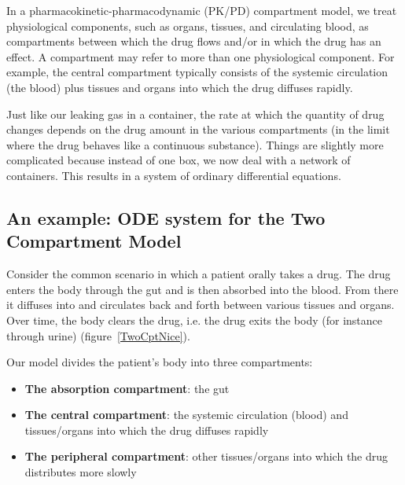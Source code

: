 \documentclass[11pt]{article}
\begin{document}
  In a pharmacokinetic-pharmacodynamic (PK/PD) compartment model, we treat physiological
  components, such as organs, tissues, and circulating blood, as compartments between which
  the drug flows and/or in which the drug has an effect. A compartment may refer to more than  
  one physiological component. For example, the central compartment typically consists of the 
  systemic circulation (the blood) plus tissues and organs into which the drug diffuses rapidly.

  Just like our leaking gas in a container, the rate at which the quantity of drug changes depends
  on the drug amount in the various compartments (in the limit where the drug behaves like a 
  continuous substance). Things are slightly more complicated because instead of one box, 
  we now deal with a network of containers. This results in a system of ordinary differential equations.
  
  \subsection{An example: ODE system for the Two Compartment Model}
  
Consider the common scenario in which a patient orally takes a drug. The drug enters the body
through the gut and is then absorbed into the blood. From there it diffuses into and circulates back
and forth between various tissues and organs. Over time, the body clears the drug, i.e. the drug exits 
the body (for instance through urine)  (figure~\ref{TwoCptNice}).

Our model divides the patient's body into three compartments:
\begin{itemize}
  \item \textbf{The absorption compartment}: the gut
  \item \textbf{The central compartment}: the systemic circulation (blood) and tissues/organs 
  into which the drug diffuses rapidly
  \item \textbf{The peripheral compartment}: other tissues/organs into which the drug 
  distributes more slowly
\end{itemize}
\end{document}
